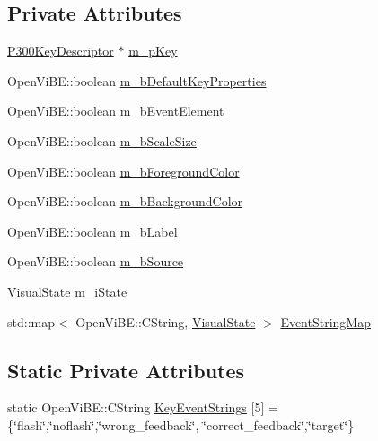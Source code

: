 \subsection*{Private Attributes}
\begin{DoxyCompactItemize}
\item 
\hyperlink{classOpenViBEApplications_1_1P300KeyDescriptor}{P300KeyDescriptor} $\ast$ \hyperlink{classOpenViBEApplications_1_1P300ScreenLayoutReader_a998f88c4be7972464f515d7481756282}{m\_\-pKey}
\item 
OpenViBE::boolean \hyperlink{classOpenViBEApplications_1_1P300ScreenLayoutReader_a1fddb81ebbe2c1254d53701ad444df37}{m\_\-bDefaultKeyProperties}
\item 
OpenViBE::boolean \hyperlink{classOpenViBEApplications_1_1P300ScreenLayoutReader_aca3bb43152a12823d2b7ffbd436dbf5d}{m\_\-bEventElement}
\item 
OpenViBE::boolean \hyperlink{classOpenViBEApplications_1_1P300ScreenLayoutReader_ae8dd0bcf7a51da978ab79540258b545f}{m\_\-bScaleSize}
\item 
OpenViBE::boolean \hyperlink{classOpenViBEApplications_1_1P300ScreenLayoutReader_af2acb9e994ede69d877a6124b414c4cf}{m\_\-bForegroundColor}
\item 
OpenViBE::boolean \hyperlink{classOpenViBEApplications_1_1P300ScreenLayoutReader_a06265a57fb8b963afcf3372cbfcf85f3}{m\_\-bBackgroundColor}
\item 
OpenViBE::boolean \hyperlink{classOpenViBEApplications_1_1P300ScreenLayoutReader_adb61b9176dd1167e810a4cbabec770af}{m\_\-bLabel}
\item 
OpenViBE::boolean \hyperlink{classOpenViBEApplications_1_1P300ScreenLayoutReader_a2b3872e5aff9fc519750fb03554a5856}{m\_\-bSource}
\item 
\hyperlink{ova__defines_8h_ac2575a0c79ceb4592555fa66f173dfc8}{VisualState} \hyperlink{classOpenViBEApplications_1_1P300ScreenLayoutReader_aa159d2cad50b6c8d28333c6168e02afe}{m\_\-iState}
\item 
std::map$<$ OpenViBE::CString, \hyperlink{ova__defines_8h_ac2575a0c79ceb4592555fa66f173dfc8}{VisualState} $>$ \hyperlink{classOpenViBEApplications_1_1P300ScreenLayoutReader_a21768f09c053da393143377b54b28141}{EventStringMap}
\end{DoxyCompactItemize}
\subsection*{Static Private Attributes}
\begin{DoxyCompactItemize}
\item 
static OpenViBE::CString \hyperlink{classOpenViBEApplications_1_1P300ScreenLayoutReader_a81215a28076035f0ef7aa51879c4839f}{KeyEventStrings} \mbox{[}5\mbox{]} = \{\char`\"{}flash\char`\"{},\char`\"{}noflash\char`\"{},\char`\"{}wrong\_\-feedback\char`\"{}, \char`\"{}correct\_\-feedback\char`\"{},\char`\"{}target\char`\"{}\}
\end{DoxyCompactItemize}


